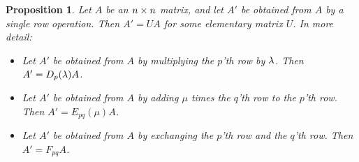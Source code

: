 \documentclass[reqno]{amsart}
\newtheorem{proposition}[theorem]{Proposition}
\theoremstyle{definition}
\begin{document}
\begin{proposition}\label{prop-ro-elem}
 Let $A$ be an $n\times n$ matrix, and let $A'$ be obtained from $A$ by a
 single row operation.  Then $A'=UA$ for some elementary matrix $U$.
 In more detail:
 \begin{itemize}
  \item[(a)] Let $A'$ be obtained from $A$ by multiplying the $p$'th
   row by $\lambda$.  Then $A'=D_p(\lambda)A$.
  \item[(b)] Let $A'$ be obtained from $A$ by adding $\mu$ times the
   $q$'th row to the $p$'th row.  Then $A'=E_{pq}(\mu)A$.
  \item[(c)] Let $A'$ be obtained from $A$ by exchanging the $p$'th
   row and the $q$'th row.  Then $A'=F_{pq}A$.
 \end{itemize}
\end{proposition}
\end{document}
